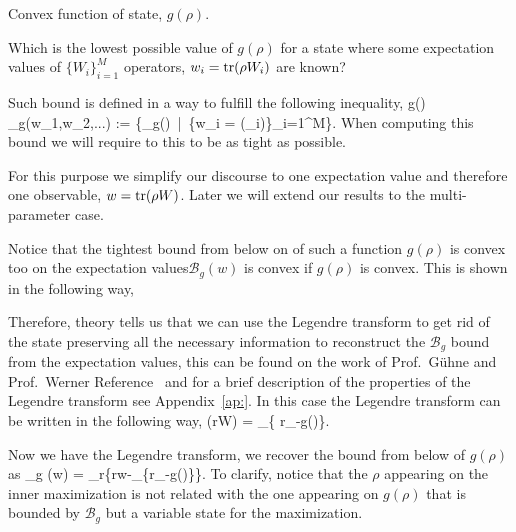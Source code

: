 Convex function of state, $g(\rho)$.

Which is the lowest possible value of $g(\rho)$ for a state where some expectation values of $\{W_{i}\}_{i=1}^M$ operators, $w_i = \operatorname{tr}(\rho {W}_i)$ are known?

Such bound is defined in a way to fulfill the following inequality,
\be
  g(\rho) \geq {}_{g}(w_1,w_2,...) := \big\{\min_{\rho}g(\rho) \,|\,  \{w_i = \tr(_i)\}_{i=1}^M\big\}.
\ee
When computing this bound we will require to this to be as tight as possible.

For this purpose we simplify our discourse to one expectation value and therefore one observable, $w = \operatorname{tr}(\rho W)$.
Later we will extend our results to the multi-parameter case.

Notice that the tightest bound from below on of such a function $g(\rho)$ is convex too on the expectation values\ie $\mathcal{B}_g(w)$ is convex if $g(\rho)$ is convex.
This is shown in the following way,

Therefore, theory tells us that we can use the Legendre transform to get rid of the state preserving all the necessary information to reconstruct the $\mathcal{B}_{g}$ bound from the expectation values, this can be found on the work of Prof.~G\"uhne and Prof.~Werner Reference~\citep{XXX} and for a brief description of the properties of the Legendre transform see Appendix~\ref{ap:}.
In this case the Legendre transform can be written in the following way,
\be
  (rW) = \sup_{\rho}\{ r_{\rho}-g(\rho)\}.
\ee

Now we have the Legendre transform, we recover the bound from below of $g(\rho)$ as
\be
  \label{eq:lt-generic-bound-for-convex-func}
  _g (w) = \sup_{r}\big\{rw-\sup_{\rho}\{r_{\rho}-g(\rho)\}\big\}.
\ee
To clarify, notice that the $\rho$ appearing on the inner maximization is not related with the one appearing on $g(\rho)$ that is bounded by $\mathcal{B}_g$ but a variable state for the maximization.

